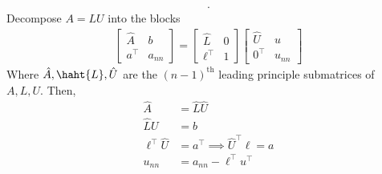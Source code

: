 \documentclass{report}
\begin{document}
\begin{itemize}
\begin{align*}
            .\end{align*}
            Decompose $A = LU$ into the blocks
            \begin{align*}
                \begin{bmatrix}
                    \hat{A} & b \\
                    a^{\top} & a_{nn}
                \end{bmatrix}
                = 
                \begin{bmatrix}
                    \hat{L} & 0 \\
                    \ell^{\top} & 1
                \end{bmatrix}
                \begin{bmatrix}
                    \hat{U} & u \\
                    0^{\top} & u_{nn}
                \end{bmatrix}
            \end{align*}
            Where $\hat{A}, \haht{L}, \hat{U}$ are the $(n-1)^{\text{th}}$ leading principle submatrices of $A,L,U$.
            \bigbreak \noindent 
            Then, 
            \begin{align*}
                \hat{A} &= \hat{L}\hat{U} \\
                \hat{L}U &= b  \\
                \ell^{\top} \hat{U} &= a^{\top} \implies \hat{U}^{\top}\ell = a \\
                u_{nn} &= a_{nn} - \ell^{\top}u^{\top}
            \end{align*}


            



\end{itemize}
\end{document}
